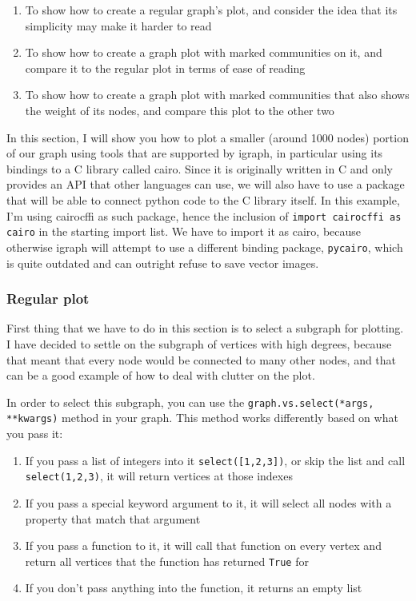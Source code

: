 \documentclass[12pt, a4paper]{article}
\begin{document}
\begin{enumerate}
  \item To show how to create a regular graph's plot, and consider the idea that its simplicity may make it harder to read
  \item To show how to create a graph plot with marked communities on it, and compare it to the regular plot in terms of ease of reading
  \item To show how to create a graph plot with marked communities that also shows the weight of its nodes, and compare this plot to the other two
\end{enumerate}


In this section, I will show you how to plot a smaller (around 1000 nodes) portion of our graph using tools that are supported by igraph, in particular using its bindings to a C library called cairo. Since it is originally written in C and only provides an API that other languages can use, we will also have to use a package that will be able to connect python code to the C library itself. In this example, I'm using cairocffi as such package, hence the inclusion of \texttt{import cairocffi as cairo} in the starting import list. We have to import it as cairo, because otherwise igraph will attempt to use a different binding package, \texttt{pycairo}, which is quite outdated and can outright refuse to save vector images.

\subsubsection{Regular plot}

First thing that we have to do in this section is to select a subgraph for plotting. I have decided to settle on the subgraph of vertices with high degrees, because that meant that every node would be connected to many other nodes, and that can be a good example of how to deal with clutter on the plot.

In order to select this subgraph, you can use the \texttt{graph.vs.select(*args, **kwargs)} method in your graph. This method works differently based on what you pass it:\newline

\begin{enumerate}
  \item If you pass a list of integers into it \texttt{select([1,2,3])}, or skip the list and call \texttt{select(1,2,3)}, it will return vertices at those indexes
  \item If you pass a special keyword argument to it, it will select all nodes with a property that match that argument
  \item If you pass a function to it, it will call that function on every vertex and return all vertices that the function has returned \texttt{True} for
  \item If you don't pass anything into the function, it returns an empty list
\end{enumerate}
\end{document}
